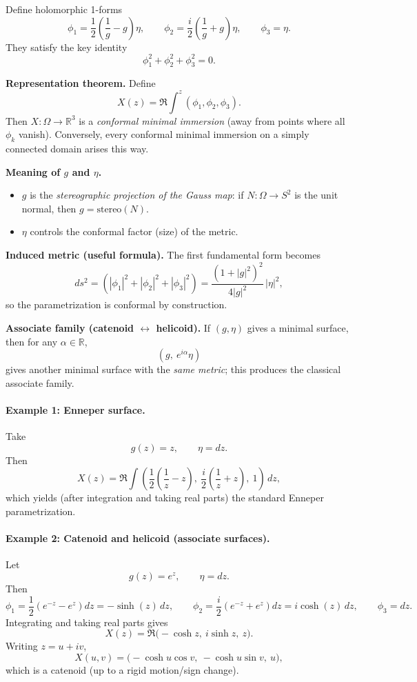\documentclass[12pt,a4paper]{article}
\theoremstyle{plain}
\theoremstyle{definition}      %
\begin{document}
	Define holomorphic 1-forms
	\[
	\phi_1=\frac12\left(\frac{1}{g}-g\right)\eta,\qquad
	\phi_2=\frac{i}{2}\left(\frac{1}{g}+g\right)\eta,\qquad
	\phi_3=\eta.
	\]
	They satisfy the key identity
	\[
	\phi_1^2+\phi_2^2+\phi_3^2=0.
	\]
	
	\medskip
	\textbf{Representation theorem.}
	Define
	\[
	X(z)=\Re\int^z (\phi_1,\phi_2,\phi_3).
	\]
	Then $X:\Omega\to\mathbb{R}^3$ is a \emph{conformal minimal immersion} (away from points where all $\phi_k$ vanish).
	Conversely, every conformal minimal immersion on a simply connected domain arises this way.
	
	\medskip
	\textbf{Meaning of $g$ and $\eta$.}
	\begin{itemize}
		\item $g$ is the \emph{stereographic projection of the Gauss map}:
		if $N:\Omega\to S^2$ is the unit normal, then $g=\mathrm{stereo}(N)$.
		\item $\eta$ controls the conformal factor (size) of the metric.
	\end{itemize}
	
	\medskip
	\textbf{Induced metric (useful formula).}
	The first fundamental form becomes
	\[
	ds^2 = \left(|\phi_1|^2+|\phi_2|^2+|\phi_3|^2\right)
	= \frac{(1+|g|^2)^2}{4|g|^2}\,|\eta|^2,
	\]
	so the parametrization is conformal by construction.
	
	\medskip
	\textbf{Associate family (catenoid $\leftrightarrow$ helicoid).}
	If $(g,\eta)$ gives a minimal surface, then for any $\alpha\in\mathbb{R}$,
	\[
	(g,\ e^{i\alpha}\eta)
	\]
	gives another minimal surface with the \emph{same metric}; this produces the classical associate family.
	
	\bigskip
	\paragraph{Example 1: Enneper surface.}
	Take
	\[
	g(z)=z,\qquad \eta = dz.
	\]
	Then
	\[
	X(z)=\Re\int \left(\frac12\left(\frac{1}{z}-z\right),\ \frac{i}{2}\left(\frac{1}{z}+z\right),\ 1\right)\,dz,
	\]
	which yields (after integration and taking real parts) the standard Enneper parametrization.
	
	\bigskip
	\paragraph{Example 2: Catenoid and helicoid (associate surfaces).}
	Let
	\[
	g(z)=e^{z},\qquad \eta=dz.
	\]
	Then
	\[
	\phi_1=\frac12(e^{-z}-e^{z})dz=-\sinh(z)\,dz,\qquad
	\phi_2=\frac{i}{2}(e^{-z}+e^{z})dz=i\cosh(z)\,dz,\qquad
	\phi_3=dz.
	\]
	Integrating and taking real parts gives
	\[
	X(z)=\Re\bigl(-\cosh z,\ i\sinh z,\ z\bigr).
	\]
	Writing $z=u+iv$,
	\[
	X(u,v)=\bigl(-\cosh u\cos v,\ -\cosh u\sin v,\ u\bigr),
	\]
	which is a catenoid (up to a rigid motion/sign change).
	
\end{document}
